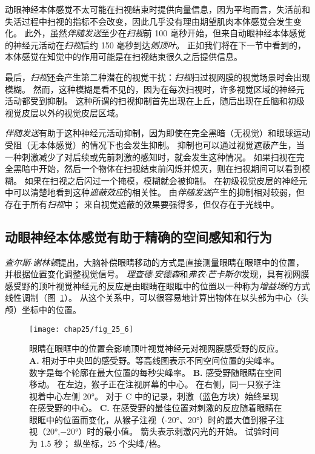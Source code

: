 动眼神经本体感觉不太可能在扫视结束时提供向量信息，因为平均而言，失活前和失活过程中扫视的指标不会改变，因此几乎没有理由期望肌肉本体感觉会发生变化。
此外，虽然\textit{伴随发送}至少在\textit{扫视}前 100 毫秒开始，但来自动眼神经本体感觉的神经元活动在\textit{扫视}后约 150 毫秒到达\textit{侧顶叶}。
正如我们将在下一节中看到的，本体感觉在知觉中的作用可能是在扫视结束很久之后提供信息。


最后，\textit{扫视}还会产生第二种潜在的视觉干扰：\textit{扫视}扫过视网膜的视觉场景时会出现模糊。
然而，这种模糊是看不见的，因为在每次扫视时，许多视觉区域的神经元活动都受到抑制。
这种所谓的扫视抑制首先出现在上丘，随后出现在丘脑和初级视觉皮层以外的视觉皮层区域。


\textit{伴随发送}有助于这种神经元活动抑制，因为即使在完全黑暗（无视觉）和眼球运动受阻（无本体感觉）的情况下也会发生抑制。
抑制也可以通过视觉遮蔽产生，当一种刺激减少了对后续或先前刺激的感知时，就会发生这种情况。
如果扫视在完全黑暗中开始，然后一个物体在扫视结束前闪烁并熄灭，则在扫视期间可以看到模糊。
如果在扫视之后闪过一个掩模，模糊就会被抑制。
在初级视觉皮层的神经元中可以清楚地看到这种\textit{遮蔽效应}的相关性。
由\textit{伴随发送}产生的抑制相对较弱，但存在于所有\textit{扫视}中；
来自视觉遮蔽的效果要强得多，但仅存在于光线中。



\subsection{动眼神经本体感觉有助于精确的空间感知和行为}

\textit{查尔斯$\cdot$谢林顿}提出，大脑补偿眼睛移动的方式是直接测量眼睛在眼眶中的位置，并根据位置变化调整视觉信号。
\textit{理查德$\cdot$安德森}和\textit{弗农$\cdot$芒卡斯尔}发现，具有视网膜感受野的顶叶视觉神经元的反应是由眼睛在眼眶中的位置以一种称为\textit{增益场}的方式线性调制（图~\ref{fig:25_6}）。
从这个关系中，可以很容易地计算出物体在以头部为中心（头颅）坐标中的位置。


\begin{figure}[htbp]
	\centering
	\texttt{[image: chap25/fig\_25\_6]}
	\caption{眼睛在眼眶中的位置会影响顶叶视觉神经元对视网膜感受野的反应。
		\textbf{A.} 相对于中央凹的感受野。等高线图表示不同空间位置的尖峰率。
		数字是每个轮廓在最大位置的每秒尖峰率。
		\textbf{B.} 感受野随眼睛在空间移动。
		在左边，猴子正在注视屏幕的中心。
		在右侧，同一只猴子注视着中心左侧 20°。
		对于 C 中的记录，刺激（蓝色方块）始终呈现在感受野的中心。
		\textbf{C.} 在感受野的最佳位置对刺激的反应随着眼睛在眼眶中的位置而变化，从猴子注视（-20°、20°）时的最大值到猴子注视（20°,−20°）时的最小值。
		箭头表示刺激闪光的开始。
		试验时间为 1.5 秒；
		纵坐标，25 个尖峰/格\cite{andersen1985encoding}。}
	\label{fig:25_6}
\end{figure}


